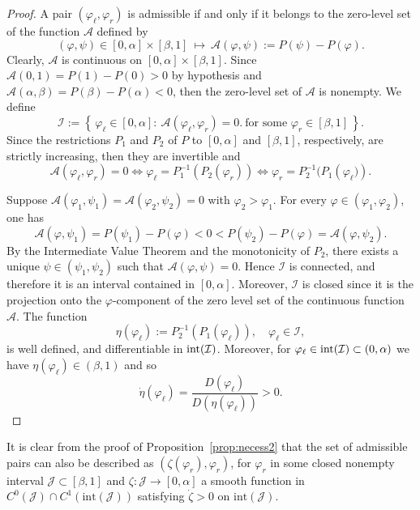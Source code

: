 \documentclass[11pt,a4paper]{article}
\renewcommand{\phi}{\varphi}
\begin{document}
\begin{proof}
A pair $(\varphi_\ell, \varphi_r)$ is admissible if and only if it belongs to the zero-level set of the function $\mathcal A$ defined by
\[
(\varphi, \psi) \in [0,\alpha]\times [\beta,1] \ \longmapsto\ 
\mathcal A(\varphi, \psi) := P(\psi) - P(\varphi).
\]
Clearly, $\mathcal A$ is continuous on $[0,\alpha]\times[\beta,1]$. Since 
$\mathcal A(0,1) = P(1) - P(0) > 0$ by hypothesis and 
$\mathcal A(\alpha,\beta) = P(\beta)-P(\alpha) < 0$, then 
the zero-level set of $\mathcal A$ is nonempty.  
We define
\[
\mathcal I := \left\{\, \varphi_\ell \in [0,\alpha] : \ \mathcal A(\varphi_\ell, \varphi_r) = 0.
\ \text{for some } \varphi_r \in [\beta,1] \,\right\}.
\]
Since the restrictions $P_1$ and $P_2$ of $P$ to $[0,\alpha]$ and $[\beta,1]$, respectively, are strictly increasing, then they are invertible and
\[
\mathcal A(\varphi_\ell,\varphi_r)=0 
\iff \varphi_\ell = P_1^{-1}\left(P_2(\varphi_r)\right)
\iff \varphi_r = P_2^{-1}(P_1\left(\varphi_\ell)\right).
\]

Suppose  $\mathcal A(\varphi_1, \psi_1) = \mathcal A (\varphi_2, \psi_2) = 0$ with $\varphi_2 > \varphi_1$.  
For every $\varphi \in (\varphi_1, \varphi_2)$, one has 
\[
\mathcal A(\varphi, \psi_1) = P(\psi_1) - P(\varphi) < 0 < P(\psi_2) - P(\varphi) = \mathcal A(\varphi, \psi_2).
\] 
By the Intermediate Value Theorem and the monotonicity of $P_2$, there exists a unique $\psi \in (\psi_1, \psi_2)$ such that $\mathcal A(\varphi,\psi)=0$.  
Hence $\mathcal I$ is connected, and therefore it is an interval contained in $[0,\alpha]$. Moreover, $\mathcal I$ is closed since it is the projection onto the $\varphi$-component of the zero level set of the continuous function $\mathcal A$. The function
\[
\eta(\varphi_\ell) := P_2^{-1}\left(P_1(\varphi_\ell)\right),
\quad \varphi_\ell \in \mathcal I,
\]
is well defined, and differentiable in ${\rm int}(\mathcal I)$. Moreover, for $\varphi_\ell \in {\rm int}(\mathcal{I})\subset(0,\alpha)$ we have $\eta(\varphi_\ell)\in (\beta,1)$ and so
\[
\dot \eta(\varphi_\ell) = \frac{D(\varphi_\ell)}{D\left(\eta(\varphi_\ell)\right)} > 0.
\] 
 
\end{proof}
%
It is clear from the proof of Proposition~\ref{prop:necess2} that the set of admissible pairs can also be described as $\left(\zeta(\phi_r),\phi_r\right)$, for $\phi_r$ in some closed nonempty interval $\mathcal{J}\subset[\beta,1]$ and $\zeta:\mathcal{J}\to[0,\alpha]$ a smooth function in $C^0(\mathcal J) \cap C^1\left(\mathrm{int}(\mathcal J)\right)$ satisfying $\dot{\zeta} > 0$ on $\mathrm{int}(\mathcal J)$.
\end{document}
